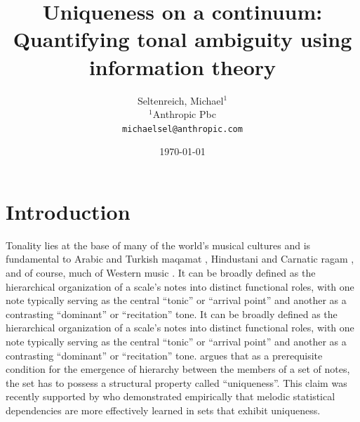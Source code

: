 \documentclass[10pt,twocolumn]{article}
\title{Uniqueness on a continuum: Quantifying tonal ambiguity using
information theory}
\author{Seltenreich, Michael$^{1}$\\[4pt]
\small $^{1}$Anthropic Pbc\\
\small \texttt{michaelsel@anthropic.com}
}
\date{\today}
\numberwithin{equation}{section} %
\begin{document}

\section{Introduction}\label{sec:intro}

Tonality lies
at the base of many of the world’s musical cultures and is fundamental to
Arabic and Turkish maqamat \citep{Farraj2019,Signell2008}, Hindustani and Carnatic ragam \citep{Castellano1984}, and of course, much of Western music \citep{KrumhanslKeil1982}. It can be broadly defined as the
hierarchical organization of a scale’s notes into distinct functional roles,
with one note typically serving as the central “tonic” or “arrival point” and
another as a contrasting “dominant” or “recitation” tone. It can be broadly
defined as the hierarchical organization of a scale’s notes into distinct
functional roles, with one note typically serving as the central “tonic” or
“arrival point” and another as a contrasting “dominant” or “recitation” tone. \citet{Balzano1982} argues that as a prerequisite condition
for the emergence of hierarchy between the members of a set of notes, the set
has to possess a structural property called “uniqueness”. This claim was recently
supported by \citet{Pelofi2021} who demonstrated empirically that
melodic statistical dependencies are more effectively learned in sets that
exhibit uniqueness.
\end{document}
